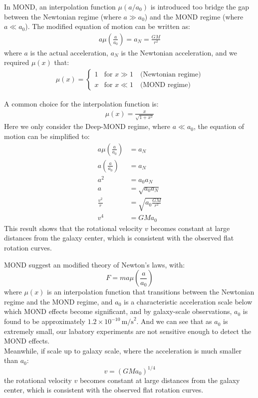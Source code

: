 \bigskip \noindent
\begin{foundation}
    In MOND, an interpolation function $\mu(a/a_0)$ is introduced too bridge the gap between the Newtonian regime (where $a \gg a_0$) and the MOND regime (where $a \ll a_0$). The modified equation of motion can be written as:
    \begin{align*}
        a \mu \left( \frac{a}{a_0} \right) = a_N = \frac{GM}{r^2}
    \end{align*}
    where $a$ is the actual acceleration, $a_N$ is the Newtonian acceleration, and we required $\mu(x) $ that:
    \begin{align*}
        \mu (x) = \begin{cases}
            1 & \text{for } x \gg 1 \quad \text{(Newtonian regime)} \\
            x & \text{for } x \ll 1 \quad \text{(MOND regime)}
        \end{cases}
    \end{align*}

    A common choice for the interpolation function is:
    \begin{align*}
        \mu(x) = \frac{x}{\sqrt{1+x^2}}
    \end{align*}
    Here we only consider the Deep-MOND regime, where $a \ll a_0$, the equation of motion can be simplified to:
    \begin{align*}
        a \mu \left( \frac{a}{a_0} \right) &= a_N \\
        a \left( \frac{a}{a_0} \right) &= a_N \\
        a^2 &= a_0 a_N \\
        a &= \sqrt{a_0 a_N} \\
        \frac{v^2}{r} &= \sqrt{a_0 \frac{GM}{r^2}} \\
        v^4 &= G M a_0
    \end{align*}
    This result shows that the rotational velocity $v$ becomes constant at large distances from the galaxy center, which is consistent with the observed flat rotation curves.
\end{foundation}

\bigskip \noindent
\begin{theory}
    MOND suggest an modified theory of Newton's laws, with:
    \[
        F = m a \mu \left( \frac{a}{a_0} \right)
    \]
    where $\mu(x)$ is an interpolation function that transitions between the Newtonian regime and the MOND regime, and $a_0$ is a characteristic acceleration scale below which MOND effects become significant, and by galaxy-scale observations, $a_0$ is found to be approximately $1.2 \times 10^{-10} \, \text{m/s}^2$. And we can see that as $a_0$ is extremely small, our labatory experiments are not sensitive enough to detect the MOND effects. \\

    Meanwhile, if scale up to galaxy scale, where the acceleration is much smaller than $a_0$:
    \[
        v = (G M a_0)^{1/4}
    \]
    the rotational velocity $v$ becomes constant at large distances from the galaxy center, which is consistent with the observed flat rotation curves. \\
\end{theory}

